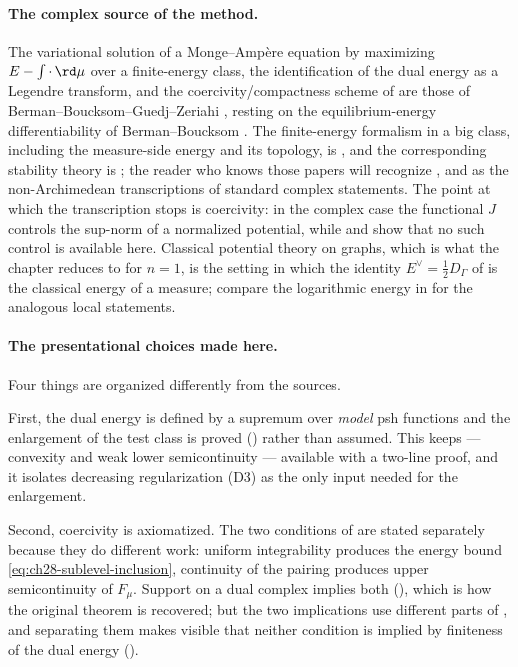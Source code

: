 \paragraph{The complex source of the method.}
The variational solution of a Monge--Amp\`ere equation by maximizing
$E-\int\cdot\,\rd\mu$ over a finite-energy class, the identification of the
dual energy as a Legendre transform, and the coercivity/compactness scheme of
 are those of Berman--Boucksom--Guedj--Zeriahi
\cite{BBGZ13}, resting on the equilibrium-energy differentiability of
Berman--Boucksom \cite{BB10}.  The finite-energy formalism in a big class,
including the measure-side energy and its topology, is \cite{BEGZ10}, and the
corresponding stability theory is \cite{BBEGZ16}; the reader who knows those
papers will recognize ,
 and  as
the non-Archimedean transcriptions of standard complex statements.  The point
at which the transcription stops is coercivity: in the complex case the
functional $J$ controls the sup-norm of a normalized potential, while
 and
 show that no such control is available
here.  Classical potential theory on graphs, which is what the chapter
reduces to for $n=1$, is the setting in which the identity
$E^\vee=\tfrac12D_\Gamma$ of  is the
classical energy of a measure; compare the logarithmic energy in
\cite{Ceg98,Ceg04} for the analogous local statements.

\paragraph{The presentational choices made here.}
Four things are organized differently from the sources.

First, the dual energy is defined by a supremum over \emph{model} psh
functions and the enlargement of the test class is proved
() rather than assumed.  This keeps
 --- convexity and weak lower
semicontinuity --- available with a two-line proof, and it isolates
decreasing regularization \textup{(D3)} as the only input needed for the
enlargement.

Second, coercivity is axiomatized.  The two conditions of
 are stated separately because they do
different work: uniform integrability produces the energy bound
\eqref{eq:ch28-sublevel-inclusion}, continuity of the pairing produces upper
semicontinuity of $F_\mu$.  Support on a dual complex implies both
(), which is how the original theorem is
recovered; but the two implications use different parts of
, and separating them makes visible
that neither condition is implied by finiteness of the dual energy
().

